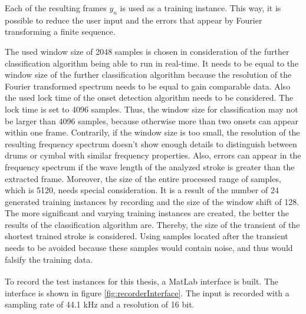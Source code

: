 Each of the resulting frames $y_n$ is used as a training instance. This way, it is possible to reduce the user input and the errors that appear by Fourier transforming a finite sequence.

The used window size of 2048 samples is chosen in consideration of the further classification algorithm being able to run in real-time. It needs to be equal to the window size of the further classification algorithm because the resolution of the Fourier transformed spectrum needs to be equal to gain comparable data. Also the used lock time of the onset detection algorithm needs to be considered. The lock time is set to 4096 samples. Thus, the window size for classification may not be larger than 4096 samples, because otherwise more than two onsets can appear within one frame. Contrarily, if the window size is too small, the resolution of the resulting frequency spectrum doesn't show enough details to distinguish between drums or cymbal with similar frequency properties. Also, errors can appear in the frequency spectrum if the wave  length of the analyzed stroke is greater than the extracted frame. Moreover, the size of the entire processed range of samples, which is 5120, needs special consideration. It is a result of the number of 24 generated training instances by recording and the size of the window shift of 128. The more significant and varying training instances are created, the better the results of the classification algorithm are. Thereby, the size of the transient of the shortest trained stroke is considered. Using samples located after the transient needs to be avoided because these samples would contain noise, and thus would falsify the training data.

To record the test instances for this thesis, a MatLab\textsuperscript{\textregistered} interface is built. The interface is shown in figure \ref{fig:recorderInterface}. The input is recorded with a sampling rate of 44.1 kHz and a resolution of 16 bit. 

